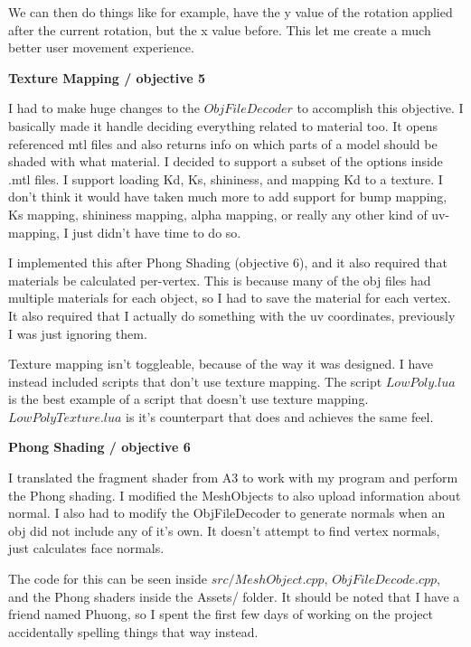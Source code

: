 \documentclass[10pt]{article}
\begin{document}
	We can then do things like for example, have the y value of the rotation applied after the current rotation, but the x value before. This let me create a much better user movement experience.
	
	\begin{center}
		\bf Texture Mapping / objective 5
	\end{center}
	
	I had to make huge changes to the $ObjFileDecoder$ to accomplish this objective. I basically made it handle deciding everything related to material too. It opens referenced mtl files and also returns info on which parts of a model should be shaded with what material. I decided to support a subset of the options inside .mtl files. I support loading Kd, Ks, shininess, and mapping Kd to a texture. I don't think it would have taken much more to add support for bump mapping, Ks mapping, shininess mapping, alpha mapping, or really any other kind of uv-mapping, I just didn't have time to do so.
	
	I implemented this after Phong Shading (objective 6), and it also required that materials be calculated per-vertex. This is because many of the obj files had multiple materials for each object, so I had to save the material for each vertex. It also required that I actually do something with the uv coordinates, previously I was just ignoring them.
	
	Texture mapping isn't toggleable, because of the way it was designed. I have instead included scripts that don't use texture mapping. The script $LowPoly.lua$ is the best example of a script that doesn't use texture mapping. $LowPolyTexture.lua$ is it's counterpart that does and achieves the same feel.
	
	\begin{center}
		\bf Phong Shading / objective 6
	\end{center}
	
	I translated the fragment shader from A3 to work with my program and perform the Phong shading. I modified the MeshObjects to also upload information about normal. I also had to modify the ObjFileDecoder to generate normals when an obj did not include any of it's own. It doesn't attempt to find vertex normals, just calculates face normals.
	
	The code for this can be seen inside $src/MeshObject.cpp$, $ObjFileDecode.cpp$, and the Phong shaders inside the Assets/ folder. It should be noted that I have a friend named Phuong, so I spent the first few days of working on the project accidentally spelling things that way instead.
	
\end{document}
